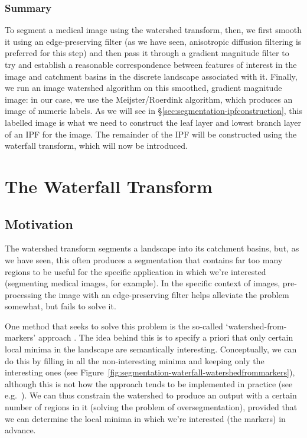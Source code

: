 \subsubsection{Summary}

To segment a medical image using the watershed transform, then, we first smooth it using an edge-preserving filter (as we have seen, anisotropic diffusion filtering is preferred for this step) and then pass it through a gradient magnitude filter to try and establish a reasonable correspondence between features of interest in the image and catchment basins in the discrete landscape associated with it. Finally, we run an image watershed algorithm on this smoothed, gradient magnitude image: in our case, we use the Meijster/Roerdink algorithm, which produces an image of numeric labels. As we will see in \S\ref{sec:segmentation-ipfconstruction}, this labelled image is what we need to construct the leaf layer and lowest branch layer of an IPF for the image. The remainder of the IPF will be constructed using the waterfall transform, which will now be introduced.

\section{The Waterfall Transform}

\subsection{Motivation}

The watershed transform segments a landscape into its catchment basins, but, as we have seen, this often produces a segmentation that contains far too many regions to be useful for the specific application in which we're interested (segmenting medical images, for example). In the specific context of images, pre-processing the image with an edge-preserving filter helps alleviate the problem somewhat, but fails to solve it.

One method that seeks to solve this problem is the so-called `watershed-from-markers' approach \cite{?}. The idea behind this is to specify a priori that only certain local minima in the landscape are semantically interesting. Conceptually, we can do this by filling in all the non-interesting minima and keeping only the interesting ones (see Figure~\ref{fig:segmentation-waterfall-watershedfrommarkers}), although this is not how the approach tends to be implemented in practice (see e.g.~\cite{felkel01}). We can thus constrain the watershed to produce an output with a certain number of regions in it (solving the problem of oversegmentation), provided that we can determine the local minima in which we're interested (the markers) in advance.

